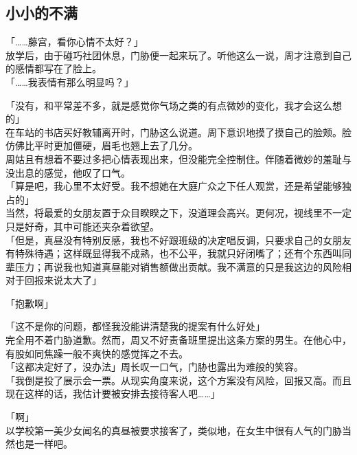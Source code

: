 \subsection{小小的不满}

「……藤宫，看你心情不太好？」\\

放学后，由于碰巧社团休息，门胁便一起来玩了。听他这么一说，周才注意到自己的感情都写在了脸上。\\

「……我表情有那么明显吗？」

「没有，和平常差不多，就是感觉你气场之类的有点微妙的变化，我才会这么想的」\\

在车站的书店买好教辅离开时，门胁这么说道。周下意识地摸了摸自己的脸颊。脸仿佛比平时更加僵硬，眉毛也翘上去了几分。\\

周姑且有想着不要过多把心情表现出来，但没能完全控制住。伴随着微妙的羞耻与没出息的感觉，他叹了口气。\\

「算是吧，我心里不太好受。我不想她在大庭广众之下任人观赏，还是希望能够独占的」\\

当然，将最爱的女朋友置于众目睽睽之下，没道理会高兴。更何况，视线里不一定只是好奇，其中可能还夹杂着欲望。\\

「但是，真昼没有特别反感，我也不好跟班级的决定唱反调，只要求自己的女朋友有特殊待遇；这样既显得我不成熟，也不公平，我就只好闭嘴了；还有个东西叫同辈压力；再说我也知道真昼能对销售额做出贡献。我不满意的只是我这边的风险相对于回报来说太大了」

「抱歉啊」

「这不是你的问题，都怪我没能讲清楚我的提案有什么好处」\\

完全用不着门胁道歉。然而，周又不好责备班里提出这条方案的男生。在他心中，有股如同焦躁一般不爽快的感觉挥之不去。\\

「这都决定好了，没办法」周长叹一口气，门胁也露出为难般的笑容。\\

「我倒是投了展示会一票。从现实角度来说，这个方案没有风险，回报又高。而且现在这样的话，我估计要被安排去接待客人吧……」

「啊」\\

以学校第一美少女闻名的真昼被要求接客了，类似地，在女生中很有人气的门胁当然也是一样吧。

